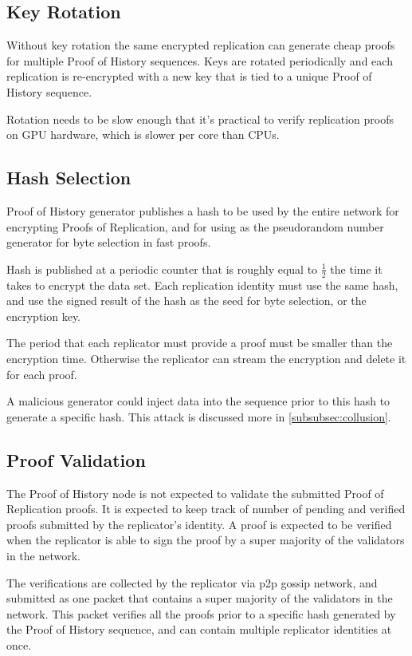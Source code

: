 \documentclass[12pt]{ltjsarticle}
\begin{document}
\subsection{Key Rotation}

Without key rotation the same encrypted replication can generate cheap proofs for multiple Proof of History sequences. Keys are rotated periodically and each replication is re-encrypted with a new key that is tied to a unique Proof of History sequence.

Rotation needs to be slow enough that it’s practical to verify replication proofs on GPU hardware, which is slower per core than CPUs.

\subsection{Hash Selection}\label{hashselection}

Proof of History generator publishes a hash to be used by the entire network for encrypting Proofs of Replication, and for using as the pseudorandom number generator for byte selection in fast proofs.

Hash is published at a periodic counter that is roughly equal to \(\frac{1}{2}\) the time it takes to encrypt the data set. Each replication identity must use the same hash, and use the signed result of the hash as the seed for byte selection, or the encryption key.

The period that each replicator must provide a proof must be smaller than the encryption time. Otherwise the replicator can stream the encryption and delete it for each proof.

A malicious generator could inject data into the sequence prior to this hash to generate a specific hash. This attack is discussed more in \ref{subsubsec:collusion}.

\subsection{Proof Validation}
The Proof of History node is not expected to validate the submitted Proof of Replication proofs. It is expected to keep track of number of pending and verified proofs submitted by the replicator’s identity. A proof is expected to be verified when the replicator is able to sign the proof by a super majority of the validators in the network.

The verifications are collected by the replicator via p2p gossip network, and submitted as one packet that contains a super majority of the validators in the network. This packet verifies all the proofs prior to a specific hash generated by the Proof of History sequence, and can contain multiple replicator identities at once.
\end{document}
